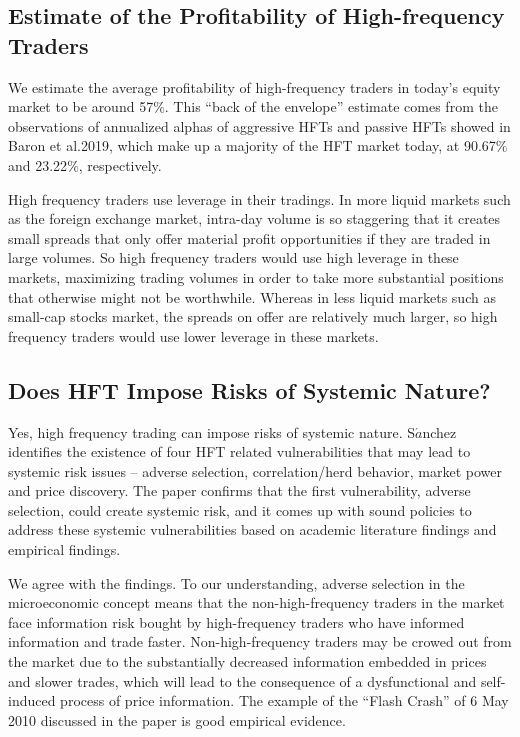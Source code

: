 \documentclass{article}
\begin{document}

\subsection{Estimate of the Profitability of High-frequency
Traders}

We estimate the average profitability of high-frequency traders in today's equity market to be around 57$\%$. This “back of the envelope” estimate comes from the observations of annualized alphas of aggressive HFTs and passive HFTs showed in Baron et al.2019\cite{Baron}, which make up a majority of the HFT market today, at 90.67$\%$ and 23.22$\%$, respectively.

High frequency traders use leverage in their tradings. In more liquid markets such as the foreign exchange market, intra-day volume is so staggering that it creates small spreads that only offer material profit opportunities if they are traded in large volumes. So high frequency traders would use high leverage in these markets, maximizing trading volumes in order to take more substantial positions that otherwise might not be worthwhile. Whereas in less liquid markets such as small-cap stocks market, the spreads on offer are relatively much larger, so high frequency traders would use lower leverage in these markets. 


\subsection{Does HFT Impose Risks of Systemic Nature?}

Yes, high frequency trading can impose risks of systemic nature. S$\acute{a}$nchez\cite{SacacacanchezSerrano} identifies the existence of four HFT related vulnerabilities that may lead to systemic risk issues – adverse selection, correlation/herd behavior, market power and price discovery. The paper confirms that the first vulnerability, adverse selection, could create systemic risk, and it comes up with sound policies to address these systemic vulnerabilities based on academic literature findings and empirical findings. 

We agree with the findings. To our understanding, adverse selection in the microeconomic concept means that the non-high-frequency traders in the market face information risk bought by high-frequency traders who have informed information and trade faster. Non-high-frequency traders may be crowed out from the market due to the substantially decreased information embedded in prices and slower trades, which will lead to the consequence of a dysfunctional and self-induced process of price information. The example of the “Flash Crash” of 6 May 2010 discussed in the paper is good empirical evidence.
\end{document}
